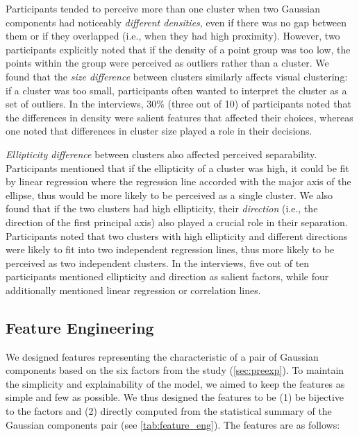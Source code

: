 Participants tended to perceive more than one cluster when two Gaussian components had noticeably \textit{different densities}, even if there was no gap between them or if they overlapped (i.e., when they had high proximity). However, two participants explicitly noted that if the density of a point group was too low, the points within the group 
were perceived as outliers rather than a cluster. We found that the \textit{size difference} between clusters similarly affects visual clustering: 
if a cluster was too small, participants often wanted to interpret the cluster as a set of outliers. In the 
interviews, 30\% (three out of 10) of participants noted that the differences in density were salient features that affected their choices, whereas 
one noted that differences in cluster size played a role in their decisions.

\textit{Ellipticity difference} between clusters 
also affected perceived separability.
Participants mentioned that if the ellipticity of a cluster was high, it 
could be fit by linear regression where the regression line accorded with the major axis of the ellipse, thus would be more likely to be perceived as a single cluster. 
We also found that if the two clusters had high ellipticity, their \textit{direction} (i.e., the direction of the first principal axis) also played a crucial role in their separation. 
Participants noted that two clusters with high ellipticity and different directions were likely to fit into two independent regression lines, thus more likely to be perceived as two independent clusters. 
In the 
interviews, five out of ten participants mentioned ellipticity and direction as salient factors, while four additionally mentioned linear regression or correlation lines. 

\subsection{Feature Engineering} 

\label{sec:feateng}


We designed features representing the characteristic of a pair of Gaussian components based on the six factors 
from the study (\autoref{sec:preexp}). 
To maintain the simplicity and explainability of the model, we aimed to keep the features as simple and few as possible.
We thus designed the features to be (1) be bijective to the factors and (2) directly computed from the statistical summary of the Gaussian components pair (see \autoref{tab:feature_eng}). 
The features are as follows: 

